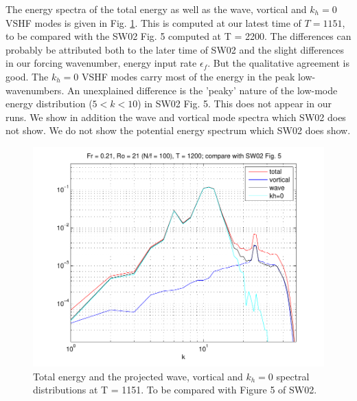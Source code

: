 \documentclass[12pt]{article}
\begin{document}
The energy spectra of the total energy as well as the wave, vortical
and $k_h=0$ VSHF modes is given in Fig. \ref{NF100_spec}. This is
computed at our latest time of $T=1151$, to be compared with the SW02
Fig. 5 computed at T = 2200. The differences can probably be
attributed both to the later time of SW02 and the slight differences
in our forcing wavenumber, energy input rate $\epsilon_f$. But the
qualitative agreement is good. The $k_h = 0$ VSHF modes carry most of
the energy in the peak low-wavenumbers. An unexplained difference is
the 'peaky' nature of the low-mode energy distribution ($5< k < 10$)
in SW02 Fig. 5. This does not appear in our runs. We show in addition
the wave and vortical mode spectra which SW02 does not show. We do not
show the potential energy spectrum which SW02 does show.
\begin{figure}[ht]
\centering
  \includegraphics[scale = 0.7]{Comp_SW02_fig5}
\caption{Total energy and the projected wave, vortical and $k_h=0$ spectral distributions at T = 1151. To be compared with Figure 5 of SW02. \label{NF100_spec}}
\end{figure}
\end{document}
